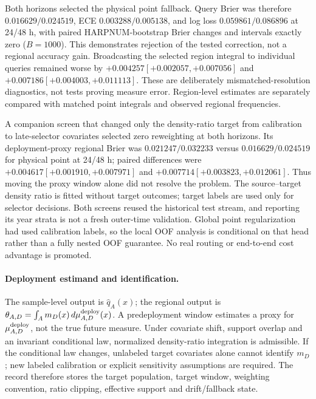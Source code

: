 \documentclass[11pt,a4paper]{article}
\numberwithin{equation}{section}
\theoremstyle{definition}\newtheorem{definition}[theorem]{Definition}
\theoremstyle{remark}\newtheorem{remark}[theorem]{Remark}
\begin{document}
Both horizons selected the physical point fallback. Query Brier was therefore $0.016629/0.024519$, ECE $0.003288/0.005138$, and log loss $0.059861/0.086896$ at 24/48 h, with paired HARPNUM-bootstrap Brier changes and intervals exactly zero ($B=1000$). This demonstrates rejection of the tested correction, not a regional accuracy gain. Broadcasting the selected region integral to individual queries remained worse by $+0.004257[+0.002057,+0.007056]$ and $+0.007186[+0.004003,+0.011113]$. These are deliberately mismatched-resolution diagnostics, not tests proving measure error. Region-level estimates are separately compared with matched point integrals and observed regional frequencies.

A companion screen that changed only the density-ratio target from calibration to late-selector covariates selected zero reweighting at both horizons. Its deployment-proxy regional Brier was $0.021247/0.032233$ versus $0.016629/0.024519$ for physical point at 24/48 h; paired differences were $+0.004617[+0.001910,+0.007971]$ and $+0.007714[+0.003823,+0.012061]$. Thus moving the proxy window alone did not resolve the problem. The source--target density ratio is fitted without target outcomes; target labels are used only for selector decisions. Both screens reused the historical test stream, and reporting its year strata is not a fresh outer-time validation. Global point regularization had used calibration labels, so the local OOF analysis is conditional on that head rather than a fully nested OOF guarantee. No real routing or end-to-end cost advantage is promoted.

\paragraph{Deployment estimand and identification.}
The sample-level output is $\widehat q_A(x)$; the regional output is $\theta_{A,D}=\int_A m_D(x)\,d\mu_{A,D}^{\rm deploy}(x)$. A predeployment window estimates a proxy for $\mu_{A,D}^{\rm deploy}$, not the true future measure. Under covariate shift, support overlap and an invariant conditional law, normalized density-ratio integration is admissible. If the conditional law changes, unlabeled target covariates alone cannot identify $m_D$; new labeled calibration or explicit sensitivity assumptions are required. The record therefore stores the target population, target window, weighting convention, ratio clipping, effective support and drift/fallback state.
\end{document}

